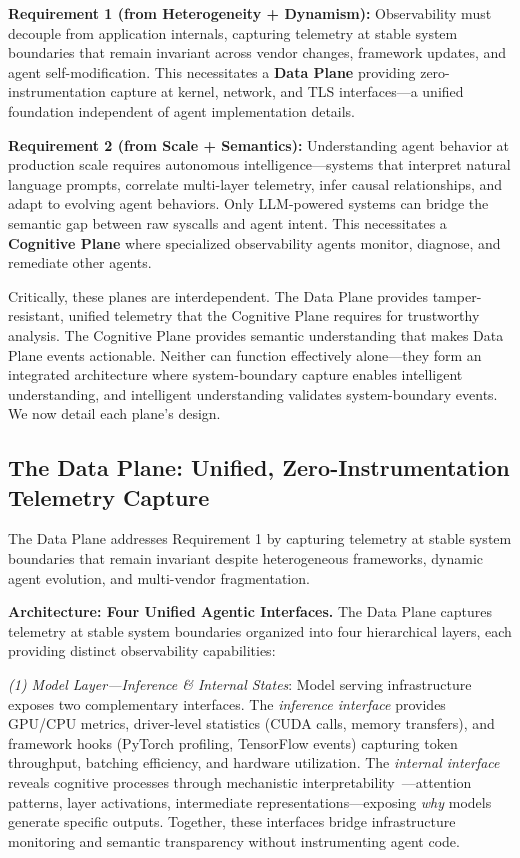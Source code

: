 \documentclass[sigplan,screen,9pt]{acmart}
\begin{document}
\textbf{Requirement 1 (from Heterogeneity + Dynamism):} Observability must decouple from application internals, capturing telemetry at stable system boundaries that remain invariant across vendor changes, framework updates, and agent self-modification. This necessitates a \textbf{Data Plane} providing zero-instrumentation capture at kernel, network, and TLS interfaces—a unified foundation independent of agent implementation details.

\textbf{Requirement 2 (from Scale + Semantics):} Understanding agent behavior at production scale requires autonomous intelligence—systems that interpret natural language prompts, correlate multi-layer telemetry, infer causal relationships, and adapt to evolving agent behaviors. Only LLM-powered systems can bridge the semantic gap between raw syscalls and agent intent. This necessitates a \textbf{Cognitive Plane} where specialized observability agents monitor, diagnose, and remediate other agents.

Critically, these planes are interdependent. The Data Plane provides tamper-resistant, unified telemetry that the Cognitive Plane requires for trustworthy analysis. The Cognitive Plane provides semantic understanding that makes Data Plane events actionable. Neither can function effectively alone—they form an integrated architecture where system-boundary capture enables intelligent understanding, and intelligent understanding validates system-boundary events. We now detail each plane's design.

\subsection{The Data Plane: Unified, Zero-Instrumentation Telemetry Capture}

The Data Plane addresses Requirement 1 by capturing telemetry at stable system boundaries that remain invariant despite heterogeneous frameworks, dynamic agent evolution, and multi-vendor fragmentation.

\textbf{Architecture: Four Unified Agentic Interfaces.} The Data Plane captures telemetry at stable system boundaries organized into four hierarchical layers, each providing distinct observability capabilities:

\emph{(1) Model Layer—Inference \& Internal States}: Model serving infrastructure exposes two complementary interfaces. The \emph{inference interface} provides GPU/CPU metrics, driver-level statistics (CUDA calls, memory transfers), and framework hooks (PyTorch profiling, TensorFlow events) capturing token throughput, batching efficiency, and hardware utilization. The \emph{internal interface} reveals cognitive processes through mechanistic interpretability~\cite{Kim2025AgenticInterp}—attention patterns, layer activations, intermediate representations—exposing \emph{why} models generate specific outputs. Together, these interfaces bridge infrastructure monitoring and semantic transparency without instrumenting agent code.
\end{document}
